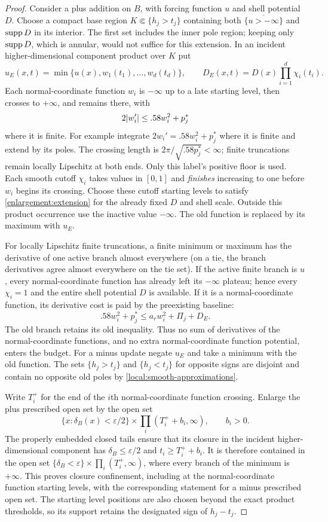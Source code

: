\begin{proof}
Consider a plus addition on $B$, with forcing function $u$ and shell
potential $D$.  Choose a compact base region $K\Subset\{h_j>t_j\}$
containing both $\overline{\{u> -\infty\}}$ and $\operatorname{supp} D$ in its
interior.  The first set includes the inner pole region; keeping only
$\operatorname{supp} D$, which is annular, would not suffice for this extension.
In an incident higher-dimensional component product over $K$ put
\begin{equation}\label{enlargement:normal-extension}
 u_E(x,t)=\min\{u(x),w_1(t_1),\ldots,w_d(t_d)\},\qquad
 D_E(x,t)=D(x)\prod_{i=1}^d\chi_i(t_i).
\end{equation}
Each normal-coordinate function $w_i$ is $-\infty$ up to a late starting level, then crosses to
$+\infty$, and remains there, with
\[
 2\lvert w_i'\rvert\le .58w_i^2+p_j^*
\]
where it is finite.  For example integrate $2w_i'=.58w_i^2+p_j^*$ where it is finite and extend by its poles.  The crossing length is
$2\pi/\sqrt{.58p_j^*}<\infty$; finite truncations remain locally
Lipschitz at both ends.  Only this label's positive floor is used.
Each smooth cutoff $\chi_i$ takes values in
$[0,1]$ and \emph{finishes} increasing to one before $w_i$ begins its
crossing.  Choose these cutoff starting levels to satisfy
\cref{enlargement:extension} for the already fixed $D$ and shell scale.
Outside this product occurrence use the inactive value $-\infty$.
The old function is replaced by its maximum with $u_E$.

For locally Lipschitz finite truncations, a finite minimum or maximum
has the derivative of one active branch almost everywhere (on a tie,
the branch derivatives agree almost everywhere on the tie set).
If the active finite branch is $u$, every normal-coordinate function has already left its
$-\infty$ plateau; hence every $\chi_i=1$ and the entire shell
potential $D$ is available.  If it is a normal-coordinate function, its derivative cost is
paid by the preexisting baseline:
\[
 .58w_i^2+p_j^*\le a_rw_i^2+\Pi_j+D_E.
\]
The old branch retains its old inequality.  Thus no sum of derivatives of the normal-coordinate functions, and no extra normal-coordinate function potential, enters the budget.
For a minus update negate $u_E$ and take a minimum with the old function.
The sets $\{h_j>t_j\}$ and $\{h_j<t_j\}$ for opposite signs are disjoint and contain
no opposite old poles by \cref{local:smooth-approximations}.

Write $T_i^+$ for the end of the $i$th normal-coordinate function crossing.  Enlarge the
plus prescribed open set by the open set
\[
 \{x:\delta_B(x)<\varepsilon/2\}\times
       \prod_i(T_i^++b_i,\infty),\qquad b_i>0.
\]
The properly embedded closed tails ensure that its closure in the
incident higher-dimensional component has $\delta_B\le\varepsilon/2$ and $t_i\ge T_i^++b_i$.
It is therefore contained in the open set
$\{\delta_B<\varepsilon\}\times\prod_i(T_i^+,\infty)$, where every
branch of the minimum is $+\infty$.  This proves closure confinement,
including at the normal-coordinate function starting levels, with the corresponding statement for a
minus prescribed open set.  The starting level positions are also chosen beyond the exact product
thresholds, so its support retains the designated sign of $h_j-t_j$.


\end{proof}
